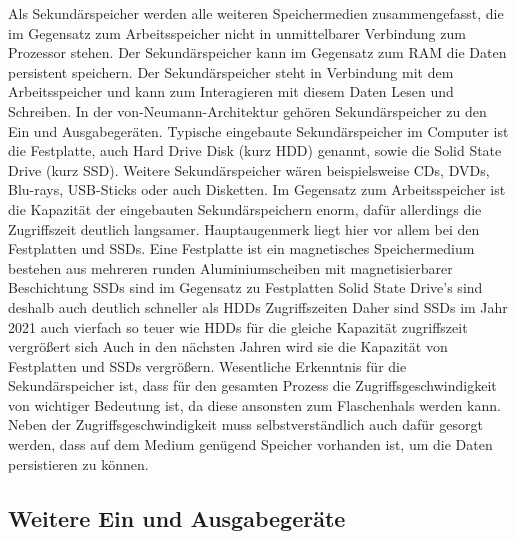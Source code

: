 Als Sekundärspeicher werden alle weiteren Speichermedien zusammengefasst, die im Gegensatz zum Arbeitsspeicher nicht in unmittelbarer Verbindung zum Prozessor stehen. Der Sekundärspeicher kann im Gegensatz zum RAM die Daten persistent speichern. 
Der Sekundärspeicher steht in Verbindung mit dem Arbeitsspeicher und kann zum Interagieren mit diesem Daten Lesen und Schreiben.
In der von-Neumann-Architektur gehören Sekundärspeicher zu den Ein und Ausgabegeräten.
Typische eingebaute Sekundärspeicher im Computer ist die Festplatte, auch Hard Drive Disk (kurz HDD) genannt, sowie die Solid State Drive (kurz SSD). Weitere Sekundärspeicher wären beispielsweise CDs, DVDs, Blu-rays, USB-Sticks oder auch Disketten. Im Gegensatz zum Arbeitsspeicher ist die Kapazität der eingebauten Sekundärspeichern enorm, dafür allerdings die Zugriffszeit deutlich langsamer. 
Hauptaugenmerk liegt hier vor allem bei den Festplatten und SSDs. Eine Festplatte ist ein magnetisches Speichermedium
bestehen aus mehreren runden Aluminiumscheiben mit magnetisierbarer Beschichtung \cite{tanenbaum}
SSDs sind im Gegensatz zu Festplatten %
Solid State Drive’s sind deshalb auch deutlich schneller als HDDs %
Zugriffszeiten
Daher sind SSDs im Jahr 2021 auch vierfach so teuer wie HDDs für die gleiche Kapazität %
zugriffszeit vergrößert sich
Auch in den nächsten Jahren wird sie die Kapazität von Festplatten und SSDs vergrößern.
Wesentliche Erkenntnis für die Sekundärspeicher ist, dass für den gesamten Prozess die Zugriffsgeschwindigkeit von wichtiger Bedeutung ist, da diese ansonsten zum Flaschenhals werden kann. Neben der Zugriffsgeschwindigkeit muss selbstverständlich auch dafür gesorgt werden, dass auf dem Medium genügend Speicher vorhanden ist, um die Daten persistieren zu können.


\subsection{Weitere Ein und Ausgabegeräte}
\label{subsec:inout}

